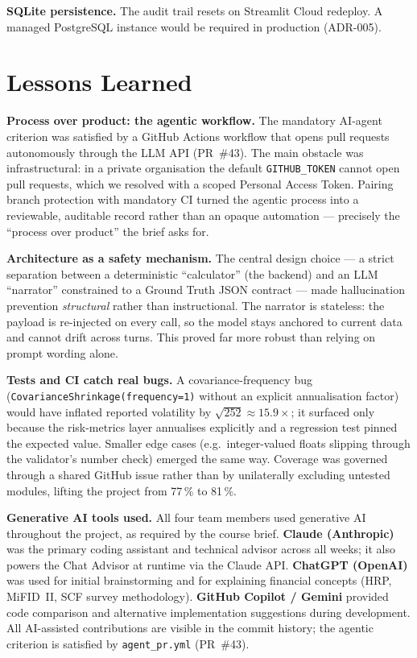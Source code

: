 \documentclass[11pt, a4paper]{article}
\begin{document}
\textbf{SQLite persistence.} The audit trail resets on Streamlit Cloud redeploy. A managed PostgreSQL instance would be required in production (ADR-005).

\section{Lessons Learned}

\textbf{Process over product: the agentic workflow.} The mandatory AI-agent criterion was satisfied by a GitHub Actions workflow that opens pull requests autonomously through the LLM API (PR~\#43). The main obstacle was infrastructural: in a private organisation the default \texttt{GITHUB\_TOKEN} cannot open pull requests, which we resolved with a scoped Personal Access Token. Pairing branch protection with mandatory CI turned the agentic process into a reviewable, auditable record rather than an opaque automation --- precisely the ``process over product'' the brief asks for.

\textbf{Architecture as a safety mechanism.} The central design choice --- a strict separation between a deterministic ``calculator'' (the backend) and an LLM ``narrator'' constrained to a Ground Truth JSON contract --- made hallucination prevention \emph{structural} rather than instructional. The narrator is stateless: the payload is re-injected on every call, so the model stays anchored to current data and cannot drift across turns. This proved far more robust than relying on prompt wording alone.

\textbf{Tests and CI catch real bugs.} A covariance-frequency bug (\texttt{CovarianceShrinkage(frequency=1)} without an explicit annualisation factor) would have inflated reported volatility by $\sqrt{252}\approx 15.9\times$; it surfaced only because the risk-metrics layer annualises explicitly and a regression test pinned the expected value. Smaller edge cases (e.g.\ integer-valued floats slipping through the validator's number check) emerged the same way. Coverage was governed through a shared GitHub issue rather than by unilaterally excluding untested modules, lifting the project from 77\,\% to 81\,\%.

\textbf{Generative AI tools used.} All four team members used generative AI throughout the project, as required by the course brief. \textbf{Claude (Anthropic)} was the primary coding assistant and technical advisor across all weeks; it also powers the Chat Advisor at runtime via the Claude API. \textbf{ChatGPT (OpenAI)} was used for initial brainstorming and for explaining financial concepts (HRP, MiFID~II, SCF survey methodology). \textbf{GitHub Copilot / Gemini} provided code comparison and alternative implementation suggestions during development. All AI-assisted contributions are visible in the commit history; the agentic criterion is satisfied by \texttt{agent\_pr.yml} (PR~\#43).
\end{document}
